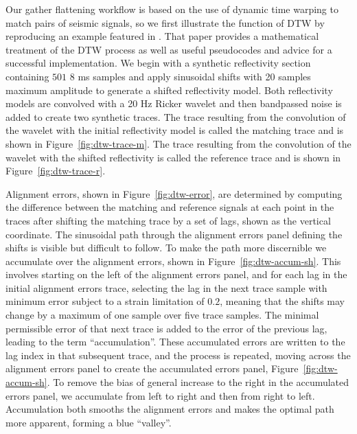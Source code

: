 
Our gather flattening workflow is based on the use of dynamic time warping to match pairs of seismic signals, so we first illustrate the function of DTW by reproducing an example featured in \cite{hale-2013}.  That paper provides a mathematical treatment of the DTW process as well as useful pseudocodes and advice for a successful implementation.  We begin with a synthetic reflectivity section containing $501$ $8$ ms samples and apply sinusoidal shifts with 20 samples maximum amplitude to generate a shifted reflectivity model.  Both reflectivity models are convolved with a 20 Hz Ricker wavelet and then bandpassed noise is added to create two synthetic traces.  The trace resulting from  the convolution of the wavelet with the initial reflectivity model is called the matching trace and is shown in Figure~\ref{fig:dtw-trace-m}. The trace resulting from the convolution of the wavelet with the shifted reflectivity is called the reference trace and is shown in Figure~\ref{fig:dtw-trace-r}.

Alignment errors, shown in Figure~\ref{fig:dtw-error}, are determined by computing the difference between the matching and reference signals at each point in the traces after shifting the matching trace by a set of lags, shown as the vertical coordinate.  The sinusoidal path through the alignment errors panel defining the shifts is visible but difficult to follow.  To make the path more discernible we accumulate over the alignment errors, shown in Figure~\ref{fig:dtw-accum-sh}.  This involves starting on the left of the alignment errors panel, and for each lag in the initial alignment errors trace, selecting the lag in the next trace sample with minimum error subject to a strain limitation of $0.2$, meaning that the shifts may change by a maximum of one sample over five trace samples.  The minimal permissible error of that next trace is added to the error of the previous lag, leading to the term ``accumulation''.  These accumulated errors are written to the lag index in that subsequent trace, and the process is repeated, moving across the alignment errors panel to create the accumulated errors panel, Figure~\ref{fig:dtw-accum-sh}.  To remove the bias of general increase to the right in the accumulated errors panel, we accumulate from left to right and then from right to left.  Accumulation both smooths the alignment errors and makes the optimal path more apparent, forming a blue ``valley''.

